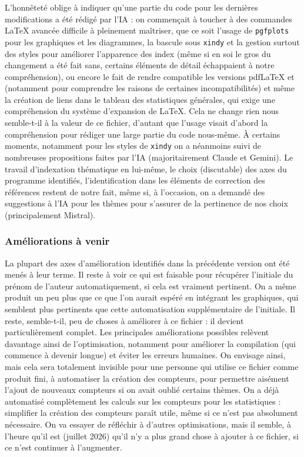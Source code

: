 L'honnêteté oblige à indiquer qu'une partie du code pour les dernières modifications a été rédigé par l'IA : on commençait à toucher à des commandes \LaTeX{} avancée difficile à pleinement maîtriser, que ce soit l'usage de \texttt{pgfplots} pour les graphiques et les diagrammes, la bascule sous \texttt{xindy} et la gestion surtout des styles pour améliorer l'apparence des index (même si en soi le gros du changement a été fait sans, certains éléments de détail échappaient à notre compréhension), ou encore le fait de rendre compatible les versions pdf\LaTeX{} et \XeLaTeX{} (notamment pour comprendre les raisons de certaines incompatibilités) et même la création de liens dans le tableau des statistiques générales, qui exige une compréhension du système d'expansion de \LaTeX{}. Cela ne change rien nous semble-t-il à la valeur de ce fichier, d'autant que l'usage visait d'abord la compréhension pour rédiger une large partie du code nous-même. À certains moments, notamment pour les styles de \texttt{xindy} on a néanmoins suivi de nombreuses propositions faites par l'IA (majoritairement Claude et Gemini). Le travail d'indexation thématique en lui-même, le choix (discutable) des axes du programme identifiés, l'identification dans les éléments de correction des références restent de notre fait, même si, à l'occasion, on a demandé des suggestions à l'IA pour les thèmes pour s'assurer de la pertinence de nos choix (principalement Mistral).

\subsubsection{Améliorations à venir}

La plupart des axes d'amélioration identifiés dans la précédente version ont été menés à leur terme. Il reste à voir ce qui est faisable pour récupérer l'initiale du prénom de l'auteur automatiquement, si cela est vraiment pertinent. On a même produit un peu plus que ce que l'on aurait espéré en intégrant les graphiques, qui semblent plus pertinents que cette automatisation supplémentaire de l'initiale. Il reste, semble-t-il, peu de choses à améliorer à ce fichier : il devient particulièrement complet. Les principales améliorations possibles relèvent davantage ainsi de l'optimisation, notamment pour améliorer la compilation (qui commence à devenir longue) et éviter les erreurs humaines. On envisage ainsi, mais cela sera totalement invisible pour une personne qui utilise ce fichier comme produit fini, à automatiser la création des compteurs, pour permettre aisément l'ajout de nouveaux compteurs si on avait oublié certains thèmes. On a déjà automatisé complètement les calculs sur les compteurs pour les statistiques : simplifier la création des compteurs paraît utile, même si ce n'est pas absolument nécessaire. On va essayer de réfléchir à d'autres optimisations, mais il semble, à l'heure qu'il est (juillet 2026) qu'il n'y a plus grand chose à ajouter à ce fichier, si ce n'est continuer à l'augmenter.

